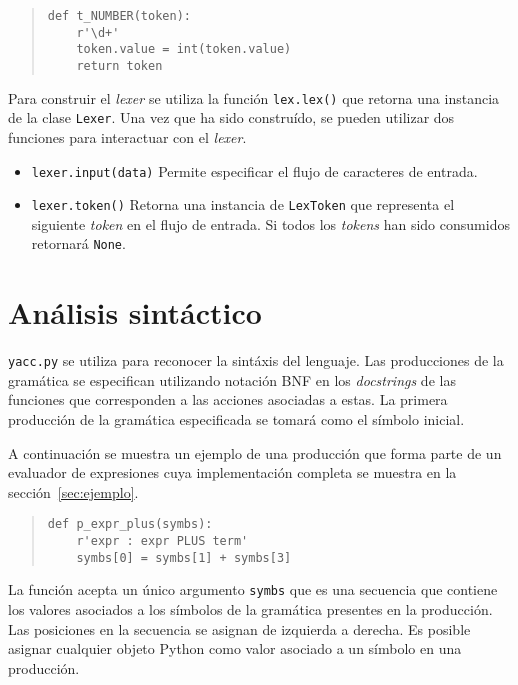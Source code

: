 \documentclass{article}
\begin{document}
\begin{quote}
\begin{verbatim}
def t_NUMBER(token):
    r'\d+'
    token.value = int(token.value)
    return token
\end{verbatim}
\end{quote}

Para construir el \textit{lexer} se utiliza la función \texttt{lex.lex()} que
retorna una instancia de la clase \texttt{Lexer}. Una vez que ha sido
construído, se pueden utilizar dos funciones para interactuar con el
\textit{lexer}.

\begin{itemize} 
  \item \texttt{lexer.input(data)} Permite especificar el flujo de caracteres
  	de entrada.
  \item \texttt{lexer.token()} Retorna una instancia de \texttt{LexToken} que
  	representa el siguiente \textit{token} en el flujo de entrada. Si todos los
  	\textit{tokens} han sido consumidos retornará \texttt{None}.
\end{itemize}

\section{Análisis sintáctico}

\texttt{yacc.py} se utiliza para reconocer la sintáxis del lenguaje. Las
producciones de la gramática se especifican utilizando notación BNF en los
\textit{docstrings} de las funciones que corresponden a las acciones asociadas
a estas. La primera producción de la gramática especificada se tomará como el
símbolo inicial.

A continuación se muestra un ejemplo de una producción que forma parte
de un evaluador de expresiones cuya implementación completa se muestra en la
sección~\ref{sec:ejemplo}.

\begin{quote}
\begin{verbatim}
def p_expr_plus(symbs):
    r'expr : expr PLUS term'
    symbs[0] = symbs[1] + symbs[3]
\end{verbatim}
\end{quote}

La función acepta un único argumento \texttt{symbs} que es una secuencia
que contiene los valores asociados a los símbolos de la gramática presentes en
la producción. Las posiciones en la secuencia se asignan de izquierda a
derecha. Es posible asignar cualquier objeto Python como valor asociado a un
símbolo en una producción.
\end{document}
